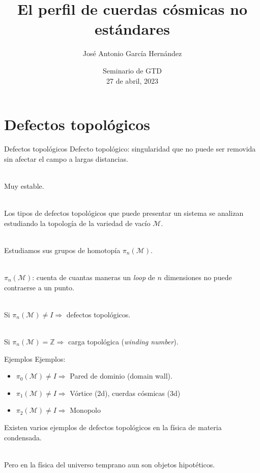 \documentclass[14pt]{beamer}
\institute{Instituto de Ciencias Nucleares, UNAM}
\author{José Antonio García Hernández}
\title{El perfil de cuerdas cósmicas no estándares}
\date{{\large Seminario de GTD} \\ 27 de abril, 2023}
\begin{document}
\begin{frame}
\titlepage
\end{frame}

\section{Defectos topológicos}
\begin{frame}{Defectos topológicos}
Defecto topológico: singularidad que no puede ser removida sin afectar el campo a largas distancias. \\~\

Muy estable.\\~\

Los tipos de defectos topológicos que puede presentar un sistema se analizan estudiando la topología de la variedad de vacío $\mathcal{M}$.\\~\


\end{frame}

\begin{frame}
Estudiamos sus grupos de homotopía $\pi_n(\mathcal{M})$.\\~\

$\pi_n(\mathcal{M})$: cuenta de cuantas maneras un \textit{loop} de $n$ dimensiones no puede contraerse a un punto. \\~\

Si $\pi_n(\mathcal{M}) \neq I \Rightarrow $ defectos topológicos. \\~\

Si $\pi_n(\mathcal{M}) = \mathbb{Z} \Rightarrow $ carga topológica (\textit{winding number}).
\end{frame}


\begin{frame}{Ejemplos}
Ejemplos:\\
\begin{itemize}
	\item $\pi_0(\mathcal{M}) \neq I \Rightarrow$ Pared de dominio (domain wall). 
	\item $\pi_1(\mathcal{M}) \neq I\Rightarrow$ Vórtice (2d), cuerdas cósmicas (3d)
	\item $\pi_2(\mathcal{M}) \neq I\Rightarrow$ Monopolo  
\end{itemize}
\end{frame}


\begin{frame}
	Existen varios ejemplos de defectos topológicos en la física de materia condensada.\\~\
	
	Pero en la física del universo temprano aun son objetos hipotéticos.
\end{frame}
\end{document}
